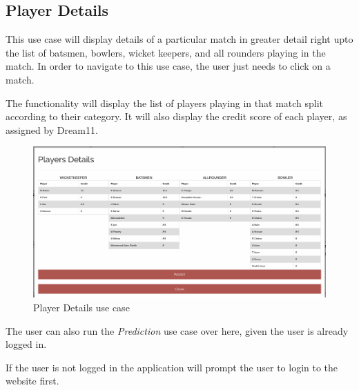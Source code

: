 \documentclass[12pt]{article}
\begin{document}
\subsection{Player Details}
\par This use case will display details of a particular match in greater detail right upto the list of batsmen, bowlers, wicket keepers, and all rounders playing in the match. In order to navigate to this use case, the user just needs to click on a match.
\par The functionality will display the list of players playing in that match split according to their category. It will also display the credit score of each player, as assigned by Dream11.
\begin{figure}[!h]
    \begin{center}
        \includegraphics[scale=0.2]{playerdetails.png}
    \end{center}
    \caption{Player Details use case}
\end{figure}
\par The user can also run the \textit{Prediction} use case over here, given the user is already logged in.
\par If the user is not logged in the application will prompt the user to login to the website first.
\end{document}
